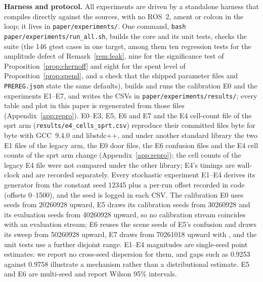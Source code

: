 \noindent\textbf{Harness and protocol.} All experiments are driven by a standalone harness that compiles directly against the  sources, with no ROS~2, ament or colcon in the loop; it lives in \nolinkurl{paper/experiments/}. One command, \nolinkurl{bash paper/experiments/run_all.sh}, builds the core and its unit tests, checks the  suite (the 146 gtest cases in one target, among them ten regression tests for the amplitude defect of Remark~\ref{rem:leak}, nine for the significance test of Proposition~\ref{prop:chernoff} and eight for the spent level of Proposition~\ref{prop:spend}, and a check that the shipped parameter files and \nolinkurl{PREREG.json} state the same defaults), builds and runs the calibration E0 and the experiments E1--E7, and writes the CSVs in \nolinkurl{paper/experiments/results/}; every table and plot in this paper is regenerated from those files (Appendix~\ref{app:repro}). E0--E3, E5, E6 and E7 and the E4 cell-count file of the sprt arm (\nolinkurl{results/e4_cells_sprt.csv}) reproduce their committed files byte for byte with GCC~9.4.0 and libstdc++, and under another standard library the two E1 files of the legacy arm, the E0 door files, the E6 confusion files and the E4 cell counts of the sprt arm change (Appendix~\ref{app:repro}); the cell counts of the legacy E4 file were not compared under the other library; E4's timings are wall-clock and are recorded separately. Every stochastic experiment E1--E4 derives its  generator from the constant seed 12345 plus a per-run offset recorded in code (offsets 0--1500), and the seed is logged in each CSV. The calibration E0 uses seeds from 20260928 upward, E5 draws its calibration seeds from 30260928 and its evaluation seeds from 40260928 upward, so no calibration stream coincides with an evaluation stream; E6 reuses the scene seeds of E5's confusion and draws its sweep from 50260928 upward, E7 draws from 70261018 upward with , and the unit tests use a further disjoint range. E1--E4 magnitudes are single-seed point estimates: we report no cross-seed dispersion for them, and gaps such as 0.9253 against 0.9758 illustrate a mechanism rather than a distributional estimate. E5 and E6 are multi-seed and report Wilson 95\% intervals.

